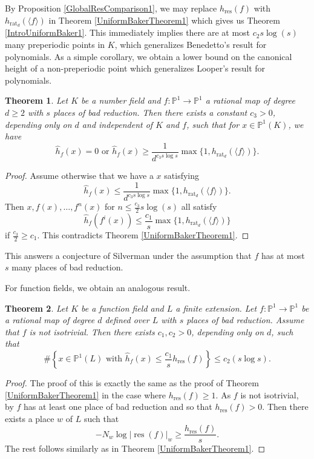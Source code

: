 \documentclass[10pt]{amsart}
\newcommand{\bb}{\mathbb}
\newcommand{\res}{\operatorname{res}}
\newcommand{\h}{\widehat{h}}
\newcommand{\rat}{\operatorname{rat}}
\newtheorem{theorem}{Theorem}
\numberwithin{theorem}{section}
\numberwithin{example}{section}
\numberwithin{definition}{section}
\begin{document}
By Proposition \ref{GlobalResComparison1}, we may replace $h_{\res}(f)$ with $h_{\rat_d}( \langle f \rangle)$ in Theorem \ref{UniformBakerTheorem1} which gives us Theorem \ref{IntroUniformBaker1}. This immediately implies there are at most $c_2 s \log(s)$ many preperiodic points in $K$, which generalizes Benedetto's result \cite{Ben07} for polynomials.  As a simple corollary, we obtain a lower bound on the canonical height of a non-preperiodic point which generalizes Looper's result \cite{Loo19} for polynomials. 

\begin{theorem} \label{UniformCanonicalHeight1}
Let $K$ be a number field and $f: \bb{P}^1 \to \bb{P}^1$ a rational map of degree $d \geq 2$ with $s$ places of bad reduction. Then there exists a constant $c_3 > 0$, depending only on $d$ and independent of $K$ and $f$, such that for $x \in \bb{P}^1(K)$, we have 
$$\h_f(x) = 0 \text{ or } \h_f(x) \geq \frac{1}{d^{c_3 s \log s}} \max\{1, h_{\rat_d}(\langle f \rangle)\}.$$
\end{theorem}

\begin{proof}
Assume otherwise that we have a $x$ satisfying 
$$\h_f(x) \leq \frac{1}{d^{c_3 s \log s}} \max\{1,h_{\rat_d}(\langle f \rangle)\}.$$
Then $x,f(x),\ldots,f^n(x)$ for $n \leq \frac{c_3}{2} s \log(s)$ all satisfy
$$\h_f(f^i(x)) \leq \frac{c_1}{s} \max\{1, h_{\rat_d}(\langle f \rangle)\}$$
if $\frac{c_3}{2} \geq c_1$. This contradicts Theorem \ref{UniformBakerTheorem1}. 
\end{proof}

This answers a conjecture of Silverman \cite[Conjecture 4.98]{Sil07} under the assumption that $f$ has at most $s$ many places of bad reduction. 
\par 
For function fields, we obtain an analogous result.

\begin{theorem} \label{UniformBakerTheorem2}
Let $K$ be a function field and $L$ a finite extension. Let $f: \bb{P}^1 \to \bb{P}^1$ be a rational map of degree $d$ defined over $L$ with $s$ places of bad reduction. Assume that $f$ is not isotrivial. Then there exists $c_1,c_2 > 0$, depending only on $d$, such that 
$$\# \left\{ x \in \bb{P}^1(L) \text{ with } \h_{f}(x)\leq \frac{c_1}{s} h_{\res}(f)  \right\} \leq  c_2 (s \log s).$$
\end{theorem}

\begin{proof}
The proof of this is exactly the same as the proof of Theorem \ref{UniformBakerTheorem1} in the case where $h_{\res}(f) \geq 1$. As $f$ is not isotrivial, by \cite[Theorem 1.9]{Bak09} $f$ has at least one place of bad reduction and so that $h_{\res}(f) > 0$. Then there exists a place $w$ of $L$ such that 
$$-N_w \log |\res(f)|_w \geq \frac{h_{\res}(f)}{s}.$$
The rest follows similarly as in Theorem \ref{UniformBakerTheorem1}.
\end{proof}
\end{document}
